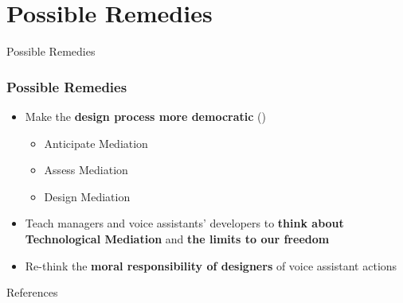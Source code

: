 \documentclass{beamer}
\begin{document}
\section{Possible Remedies}
\begin{frame}
\begin{center} 
	 Possible Remedies
\end{center}
\end{frame}

\begin{frame}
\frametitle{Possible Remedies}
\begin{itemize}
	\item Make the \textbf{design process more democratic} (\cite{verbeek2011moralizing})
	\smallskip
	\begin{itemize}
		\item Anticipate Mediation
		\item Assess Mediation
		\item Design Mediation
		
	\end{itemize}
	\medskip
	\item Teach managers and voice assistants' developers to \textbf{think about Technological Mediation} and \textbf{the limits to our freedom}
	\medskip
	\item Re-think the \textbf{moral responsibility of designers} of voice assistant actions
\end{itemize}
\end{frame}

\nocite{*}
\begin{frame}{References}
\renewcommand*{\bibfont}{\small}
\printbibliography
\end{frame}
\end{document}
